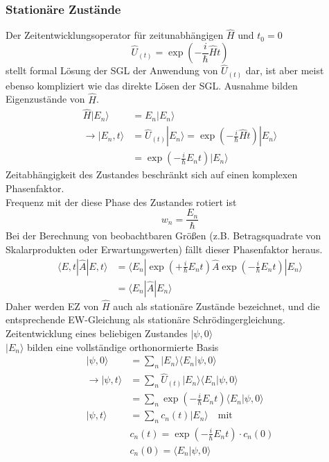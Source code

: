 \documentclass[10pt,article,colorback,accentcolor=tud9d]{scrartcl}
\begin{document}
\subsubsection{Stationäre Zustände}
Der Zeitentwicklungsoperator für zeitunabhängigen $\hat{H}$ und $t_0=0$
\begin{equation}
\hat{U}_{(t)}=\exp\left(-\frac{i}{\hbar}\hat{H}t\right)
\end{equation}
stellt formal Lösung der SGL der Anwendung von $\hat{U}_{(t)}$ dar, ist aber meist ebenso kompliziert wie das direkte Lösen der SGL. Ausnahme bilden Eigenzustände von $\hat{H}$.
\begin{align}
\hat{H}|E_n\rangle&=E_n|E_n\rangle\\
\rightarrow |E_n,t\rangle&=\hat{U}_{(t)}|E_n\rangle=\exp\left(-\frac{i}{\hbar}\hat{H}t\right)|E_n\rangle\\
&=\exp\left(-\frac{i}{\hbar}E_nt\right)|E_n\rangle
\end{align}
Zeitabhängigkeit des Zustandes beschränkt sich auf einen komplexen Phasenfaktor. \\
Frequenz mit der diese Phase des Zustandes rotiert ist
\begin{equation}
w_n=\frac{E_n}{\hbar}
\end{equation}
Bei der Berechnung von beobachtbaren Größen (z.B. Betragsquadrate von Skalarprodukten  oder Erwartungswerten) fällt dieser Phasenfaktor heraus.
\begin{align}
\langle E,t|\hat{A}|E,t\rangle&=\langle E_n |\exp\left(+\frac{i}{\hbar}E_nt\right)\hat{A}\exp\left(-\frac{i}{\hbar}E_nt\right)|E_n\rangle\\
&=\langle E_n|\hat{A}|E_n\rangle
\end{align}
Daher werden EZ von $\hat{H}$ auch als stationäre Zustände bezeichnet, und die entsprechende EW-Gleichung als stationäre Schrödingergleichung.\\
Zeitentwicklung eines beliebigen Zustandes $|\psi,0\rangle$\\
$|E_n\rangle$ bilden eine vollständige orthonormierte Basis
\begin{align}
|\psi,0\rangle&=\sum_n|E_n\rangle\langle E_n|\psi,0\rangle\\
\rightarrow |\psi,t\rangle&=\sum_n\hat{U}_{(t)}|E_n\rangle\langle E_n|\psi,0\rangle\\
&=\sum_n\exp\left(-\frac{i}{\hbar}E_nt\right)\langle E_n |\psi,0\rangle\\
|\psi,t\rangle&=\sum_nc_n(t)|E_n\rangle \quad \text{mit} \\
&c_n(t)=\exp\left(-\frac{i}{\hbar}E_nt\right)\cdot c_n(0)\\
&c_n(0)=\langle E_n|\psi,0\rangle
\end{align}
\end{document}
